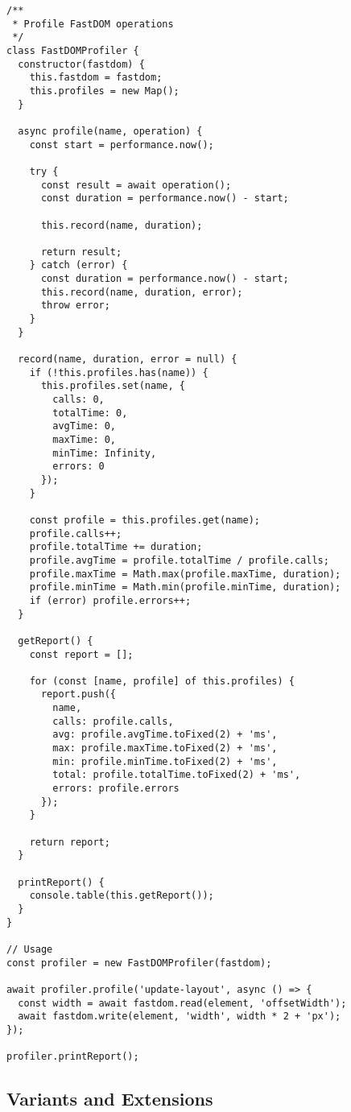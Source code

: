 \documentclass[11pt]{article}
\begin{document}
\begin{verbatim}
/**
 * Profile FastDOM operations
 */
class FastDOMProfiler {
  constructor(fastdom) {
    this.fastdom = fastdom;
    this.profiles = new Map();
  }
  
  async profile(name, operation) {
    const start = performance.now();
    
    try {
      const result = await operation();
      const duration = performance.now() - start;
      
      this.record(name, duration);
      
      return result;
    } catch (error) {
      const duration = performance.now() - start;
      this.record(name, duration, error);
      throw error;
    }
  }
  
  record(name, duration, error = null) {
    if (!this.profiles.has(name)) {
      this.profiles.set(name, {
        calls: 0,
        totalTime: 0,
        avgTime: 0,
        maxTime: 0,
        minTime: Infinity,
        errors: 0
      });
    }
    
    const profile = this.profiles.get(name);
    profile.calls++;
    profile.totalTime += duration;
    profile.avgTime = profile.totalTime / profile.calls;
    profile.maxTime = Math.max(profile.maxTime, duration);
    profile.minTime = Math.min(profile.minTime, duration);
    if (error) profile.errors++;
  }
  
  getReport() {
    const report = [];
    
    for (const [name, profile] of this.profiles) {
      report.push({
        name,
        calls: profile.calls,
        avg: profile.avgTime.toFixed(2) + 'ms',
        max: profile.maxTime.toFixed(2) + 'ms',
        min: profile.minTime.toFixed(2) + 'ms',
        total: profile.totalTime.toFixed(2) + 'ms',
        errors: profile.errors
      });
    }
    
    return report;
  }
  
  printReport() {
    console.table(this.getReport());
  }
}

// Usage
const profiler = new FastDOMProfiler(fastdom);

await profiler.profile('update-layout', async () => {
  const width = await fastdom.read(element, 'offsetWidth');
  await fastdom.write(element, 'width', width * 2 + 'px');
});

profiler.printReport();
\end{verbatim}
\subsection{Variants and Extensions}
\label{sec:org9b8ef25}
\end{document}
